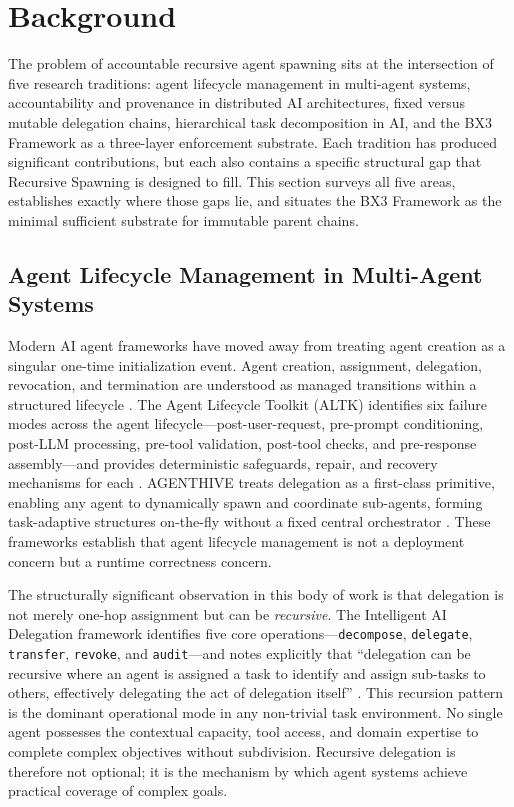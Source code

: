\section{Background}\label{sec:rs-background}

The problem of accountable recursive agent spawning sits at the intersection of five research traditions: agent lifecycle management in multi-agent systems, accountability and provenance in distributed AI architectures, fixed versus mutable delegation chains, hierarchical task decomposition in AI, and the BX3 Framework as a three-layer enforcement substrate. Each tradition has produced significant contributions, but each also contains a specific structural gap that Recursive Spawning is designed to fill. This section surveys all five areas, establishes exactly where those gaps lie, and situates the BX3 Framework as the minimal sufficient substrate for immutable parent chains.

\subsection{Agent Lifecycle Management in Multi-Agent Systems}\label{sec:lifecycle}

Modern AI agent frameworks have moved away from treating agent creation as a singular one-time initialization event. Agent creation, assignment, delegation, revocation, and termination are understood as managed transitions within a structured lifecycle \cite{agenthive2025,arxiv2603.15473}. The Agent Lifecycle Toolkit (ALTK) identifies six failure modes across the agent lifecycle---post-user-request, pre-prompt conditioning, post-LLM processing, pre-tool validation, post-tool checks, and pre-response assembly---and provides deterministic safeguards, repair, and recovery mechanisms for each \cite{arxiv2603.15473}. AGENTHIVE treats delegation as a first-class primitive, enabling any agent to dynamically spawn and coordinate sub-agents, forming task-adaptive structures on-the-fly without a fixed central orchestrator \cite{agenthive2025}. These frameworks establish that agent lifecycle management is not a deployment concern but a runtime correctness concern.

The structurally significant observation in this body of work is that delegation is not merely one-hop assignment but can be \emph{recursive}. The Intelligent AI Delegation framework identifies five core operations---\texttt{decompose}, \texttt{delegate}, \texttt{transfer}, \texttt{revoke}, and \texttt{audit}---and notes explicitly that ``delegation can be recursive where an agent is assigned a task to identify and assign sub-tasks to others, effectively delegating the act of delegation itself'' \cite{arxiv2602.11865}. This recursion pattern is the dominant operational mode in any non-trivial task environment. No single agent possesses the contextual capacity, tool access, and domain expertise to complete complex objectives without subdivision. Recursive delegation is therefore not optional; it is the mechanism by which agent systems achieve practical coverage of complex goals.

